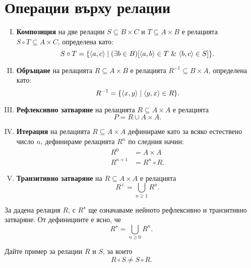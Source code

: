 \section{Операции върху релации}
\begin{enumerate}[I)]
\item
  {\bf Композиция} на две релации $S \subseteq B\times C$ и $T \subseteq A\times B$ е релацията $S\circ T \subseteq A\times C$,
  определена като:
  \[S\circ T = \{\langle{a,c}\rangle \mid (\exists b \in B)[\pair{a,b}\in T\ \&\ \pair{b,c} \in S]\}.\]
\item
  {\bf Обръщане} на релацията $R \subseteq A\times B$ е релацията $R^{-1}\subseteq B\times A$, 
  определена като:
  \[R^{-1} = \{\langle{x,y}\rangle \mid \langle{y,x}\rangle \in R\}.\]
  \item
  {\bf Рефлексивно затваряне} на релацията $R \subseteq A\times A$ е релацията
  \[P = R \cup A\times A.\]
\item
  {\bf Итерация} на релацията $R \subseteq A\times A$ дефинираме като за всяко естествено число $n$,
  дефинираме релацията $R^n$ по следния начин:
  \begin{align*}
    R^0 & = A\times A\\
    R^{n+1} & = R^n \circ R.
  \end{align*}
\item
  {\bf Транзитивно затваряне} на $R \subseteq A\times A$ е релацията
  \[R^+ = \bigcup_{n\geq 1} R^n.\]
\end{enumerate}

За дадена релация $R$, с $R^\star$ ще означаваме нейното рефлексивно и транзитивно затваряне.
От дефинициите е ясно, че \[R^\star = \bigcup_{n\geq 0} R^n.\]

\begin{problem}
  Дайте пример за релации $R$ и $S$, за които
  \[R\circ S \neq S\circ R.\]
\end{problem}

